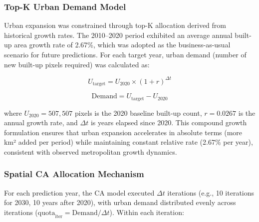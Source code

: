 \documentclass[12pt,a4paper]{article}
\begin{document}
\subsubsection{Top-K Urban Demand Model}

Urban expansion was constrained through top-K allocation derived from historical growth rates. The 2010--2020 period exhibited an average annual built-up area growth rate of 2.67\%, which was adopted as the business-as-usual scenario for future predictions. For each target year, urban demand (number of new built-up pixels required) was calculated as:

\begin{equation}
U_{\text{target}} = U_{2020} \times (1 + r)^{\Delta t}
\label{eq:demand_growth}
\end{equation}

\begin{equation}
\text{Demand} = U_{\text{target}} - U_{2020}
\label{eq:demand_calc}
\end{equation}

where $U_{2020} = 507{,}507$ pixels is the 2020 baseline built-up count, $r = 0.0267$ is the annual growth rate, and $\Delta t$ is years elapsed since 2020. This compound growth formulation ensures that urban expansion accelerates in absolute terms (more km² added per period) while maintaining constant relative rate (2.67\% per year), consistent with observed metropolitan growth dynamics.

\subsubsection{Spatial CA Allocation Mechanism}

For each prediction year, the CA model executed $\Delta t$ iterations (e.g., 10 iterations for 2030, 10 years after 2020), with urban demand distributed evenly across iterations ($\text{quota}_{\text{iter}} = \text{Demand} / \Delta t$). Within each iteration:
\end{document}

